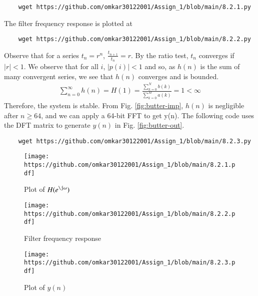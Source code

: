 \documentclass[journal,12pt,twocolumn]{IEEEtran}
\renewcommand\thesection{\arabic{section}}
\begin{document}
\begin{enumerate}[label=\thesection.\arabic*
	,ref=\thesection.\theenumi]
\begin{enumerate}[label=\thesection.\arabic*]
	\begin{lstlisting}
	wget https://github.com/omkar30122001/Assign_1/blob/main/8.2.1.py
	\end{lstlisting}
	The filter frequency response is plotted at
	\begin{lstlisting}
	wget https://github.com/omkar30122001/Assign_1/blob/main/8.2.2.py
	\end{lstlisting}
	Observe that for a series $t_n = r^n$, $\frac{t_{n + 1}}{t_n} = r$.
	By the ratio test, $t_n$ converges if $|r| < 1$. We observe that for all $i$, 
	$|p(i)| < 1$ and so, as $h(n)$ is the sum of many convergent series,
	we see that $h(n)$ converges and is bounded.
	\begin{align}
		\sum_{n = 0}^{\infty}h(n) = H(1) = \frac{\sum_{k = 0}^{N}b(k)}{\sum_{k = 0}^{M}a(k)} = 1 < \infty
	\end{align}
	Therefore, the system is stable. From
	Fig. \eqref{fig:butter-imp}, $h(n)$ is negligible after $n \geq 64$, and we
	can apply a 64-bit FFT to get y(n). The following code uses the DFT matrix
	to generate $y(n)$ in Fig. \eqref{fig:butter-out}.
	\begin{lstlisting}
	wget https://github.com/omkar30122001/Assign_1/blob/main/8.2.3.py
	\end{lstlisting}
	\begin{figure}[!htb]
		\texttt{[image: https://github.com/omkar30122001/Assign\_1/blob/main/8.2.1.pdf]}
		\caption{Plot of $H(e^{\j\omega})$}
		\label{fig:butter-imp}
	\end{figure}
	\begin{figure}[!htb]
		\texttt{[image: https://github.com/omkar30122001/Assign\_1/blob/main/8.2.2.pdf]}
		\caption{Filter frequency response}
		\label{fig:butter-resp}
	\end{figure}
	\begin{figure}[!htb]
		\texttt{[image: https://github.com/omkar30122001/Assign\_1/blob/main/8.2.3.pdf]}
		\caption{Plot of $y(n)$}
		\label{fig:butter-out}
	\end{figure}
	

\end{enumerate}
\end{enumerate}
\end{document}
